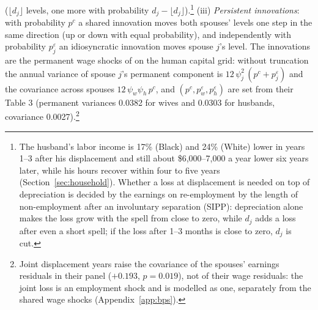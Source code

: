 ($\lfloor d_j \rfloor$ levels, one more with probability $d_j - \lfloor d_j \rfloor$).\footnote{The husband's labor
income is 17\% (Black) and 24\% (White) lower in years 1--3 after his displacement and still about \$6,000--7,000 a
year lower six years later, while his hours recover within four to five years (Section~\ref{sec:household}). Whether a
loss at displacement is needed on top of depreciation is decided by the earnings on re-employment by the length of
non-employment after an involuntary separation (SIPP): depreciation alone makes the loss grow with the spell from
close to zero, while $d_j$ adds a loss after even a short spell; if the loss after 1--3 months is close to zero, $d_j$
is cut.} (iii) \emph{Persistent innovations}: with probability $p^c$ a shared innovation moves both spouses' levels
one step in the same direction (up or down with equal probability), and independently with probability
$p^\varepsilon_j$ an idiosyncratic innovation moves spouse $j$'s level. The innovations are the permanent wage shocks of
\citet{blundell2016consumption} on the human capital grid: without truncation the annual variance of spouse $j$'s
permanent component is $12\,\psi_j^2\,(p^c + p^\varepsilon_j)$ and the covariance across spouses
$12\,\psi_w\psi_h\,p^c$, and $(p^c, p^\varepsilon_w, p^\varepsilon_h)$ are set from their Table 3 (permanent variances
0.0382 for wives and 0.0303 for husbands, covariance 0.0027).\footnote{Joint displacement years raise the covariance of
the spouses' earnings residuals in their panel ($+0.193$, $p=0.019$), not of their wage residuals: the joint loss is an
employment shock and is modelled as one, separately from the shared wage shocks (Appendix~\ref{app:bps}).}


